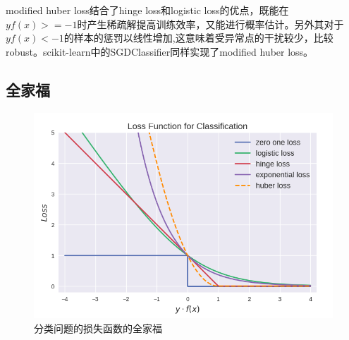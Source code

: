 \documentclass[12pt]{article}
\begin{document}
modified huber loss结合了hinge loss和logistic loss的优点，既能在 $yf(x) >= -1$时产生稀疏解提高训练效率，又能进行概率估计。另外其对于$yf(x)<-1$的样本的惩罚以线性增加,这意味着受异常点的干扰较少，比较robust。scikit-learn中的SGDClassifier同样实现了modified huber loss。

\subsection{全家福}

\begin{figure}[ht]
  \centering
  \includegraphics[width=.8\textwidth]{fig/LossFunctionForClassificationOverall.png} %
  \caption{分类问题的损失函数的全家福} %
  \label{LossFunctionForClassificationOverall} %
\end{figure}



\end{document}
